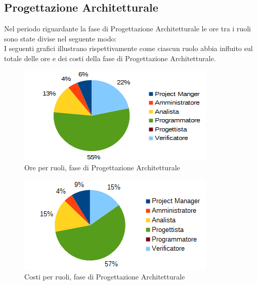 	\subsection{Progettazione Architetturale}
	Nel periodo riguardante la fase di Progettazione Architetturale le ore tra i ruoli sono state divise nel seguente modo: \\
	I seguenti grafici illustrano rispettivamente come ciascun ruolo abbia influito sul totale
delle ore e dei costi della fase di Progettazione Architetturale.
	\begin{figure}[htbp]
		\centering
		\includegraphics[scale=1]{immagini/grafici/progettazione_architetturale-torta.png}
		\caption{Ore per ruoli, fase di Progettazione Architetturale}
	\end{figure}
	\begin{figure}[htbp]
		\centering
		\includegraphics[scale=1]{immagini/grafici/progettazione_architetturale-torta-costo.png}
		\caption{Costi per ruoli, fase di Progettazione Architetturale}
	\end{figure}
